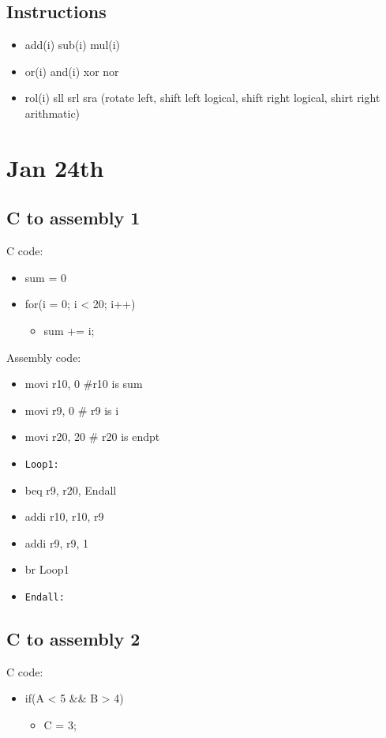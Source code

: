 \documentclass[11pt]{article}
\begin{document}
\subsection{Instructions}
\label{sec:orgheadline22}
\begin{itemize}
\item add(i) sub(i) mul(i)
\item or(i) and(i) xor nor
\item rol(i) sll srl sra (rotate left, shift left logical, shift right logical, shirt right arithmatic)
\end{itemize}

\section{Jan 24th}
\label{sec:orgheadline26}
\subsection{C to assembly 1}
\label{sec:orgheadline24}
C code:
\begin{itemize}
\item sum = 0
\item for(i = 0; i < 20; i++)
\begin{itemize}
\item sum += i;
\end{itemize}
\end{itemize}

Assembly code:
\begin{itemize}
\item movi r10, 0 \#r10 is sum
\item movi r9, 0 \# r9 is i
\item movi r20, 20 \# r20 is endpt
\item \texttt{Loop1:}
\item beq r9, r20, Endall
\item addi r10, r10, r9
\item addi r9, r9, 1
\item br Loop1
\item \texttt{Endall:}
\end{itemize}
\subsection{C to assembly 2}
\label{sec:orgheadline25}
C code:
\begin{itemize}
\item if(A < 5 \&\& B > 4)
\begin{itemize}
\item C = 3;
\end{itemize}
\end{itemize}
\end{document}
